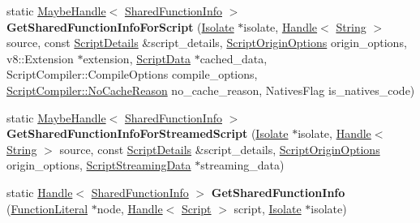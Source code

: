 \begin{DoxyCompactItemize}
\item 
\mbox{\label{classv8_1_1internal_1_1Compiler_a660cabc06d9c55931405db1e2991c333}} 
static \mbox{\hyperlink{classv8_1_1internal_1_1MaybeHandle}{Maybe\+Handle}}$<$ \mbox{\hyperlink{classv8_1_1internal_1_1SharedFunctionInfo}{Shared\+Function\+Info}} $>$ {\bfseries Get\+Shared\+Function\+Info\+For\+Script} (\mbox{\hyperlink{classv8_1_1internal_1_1Isolate}{Isolate}} $\ast$isolate, \mbox{\hyperlink{classv8_1_1internal_1_1Handle}{Handle}}$<$ \mbox{\hyperlink{classv8_1_1internal_1_1String}{String}} $>$ source, const \mbox{\hyperlink{structv8_1_1internal_1_1Compiler_1_1ScriptDetails}{Script\+Details}} \&script\+\_\+details, \mbox{\hyperlink{classv8_1_1ScriptOriginOptions}{Script\+Origin\+Options}} origin\+\_\+options, v8\+::\+Extension $\ast$extension, \mbox{\hyperlink{classv8_1_1internal_1_1ScriptData}{Script\+Data}} $\ast$cached\+\_\+data, Script\+Compiler\+::\+Compile\+Options compile\+\_\+options, \mbox{\hyperlink{classv8_1_1ScriptCompiler_a7f13fa15484cfc500ae51927756e0d60}{Script\+Compiler\+::\+No\+Cache\+Reason}} no\+\_\+cache\+\_\+reason, Natives\+Flag is\+\_\+natives\+\_\+code)
\item 
\mbox{\label{classv8_1_1internal_1_1Compiler_a4c0fb830833e82305f9d8c3fe9e89273}} 
static \mbox{\hyperlink{classv8_1_1internal_1_1MaybeHandle}{Maybe\+Handle}}$<$ \mbox{\hyperlink{classv8_1_1internal_1_1SharedFunctionInfo}{Shared\+Function\+Info}} $>$ {\bfseries Get\+Shared\+Function\+Info\+For\+Streamed\+Script} (\mbox{\hyperlink{classv8_1_1internal_1_1Isolate}{Isolate}} $\ast$isolate, \mbox{\hyperlink{classv8_1_1internal_1_1Handle}{Handle}}$<$ \mbox{\hyperlink{classv8_1_1internal_1_1String}{String}} $>$ source, const \mbox{\hyperlink{structv8_1_1internal_1_1Compiler_1_1ScriptDetails}{Script\+Details}} \&script\+\_\+details, \mbox{\hyperlink{classv8_1_1ScriptOriginOptions}{Script\+Origin\+Options}} origin\+\_\+options, \mbox{\hyperlink{structv8_1_1internal_1_1ScriptStreamingData}{Script\+Streaming\+Data}} $\ast$streaming\+\_\+data)
\item 
\mbox{\label{classv8_1_1internal_1_1Compiler_af5a9759867899ffe7c5577944b612216}} 
static \mbox{\hyperlink{classv8_1_1internal_1_1Handle}{Handle}}$<$ \mbox{\hyperlink{classv8_1_1internal_1_1SharedFunctionInfo}{Shared\+Function\+Info}} $>$ {\bfseries Get\+Shared\+Function\+Info} (\mbox{\hyperlink{classv8_1_1internal_1_1FunctionLiteral}{Function\+Literal}} $\ast$node, \mbox{\hyperlink{classv8_1_1internal_1_1Handle}{Handle}}$<$ \mbox{\hyperlink{classv8_1_1internal_1_1Script}{Script}} $>$ script, \mbox{\hyperlink{classv8_1_1internal_1_1Isolate}{Isolate}} $\ast$isolate)

\end{DoxyCompactItemize}
